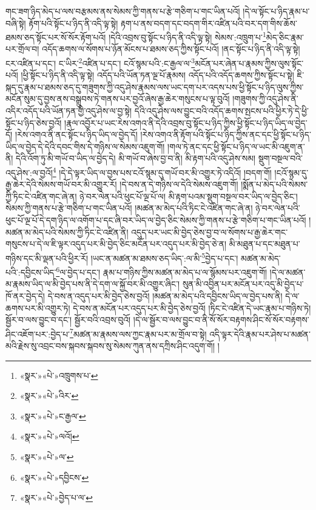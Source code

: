 གང་ཟག་ཉིད་མེད་པ་ལས་བརྩམས་ནས་སེམས་ཀྱི་གནས་པ་རྩེ་གཅིག་པ་གང་ཡིན་པའོ། །དེ་ལ་སྟོང་པ་ཉིད་རྣམ་པ་བཞི་སྟེ། རྟོག་པའི་སྟོང་པ་ཉིད་ནི་འདི་ལྟ་སྟེ། རྟག་པ་ནས་བདག་དང་བདག་གིར་འཛིན་པའི་བར་དག་གིས་ཆོས་ཐམས་ཅད་སྟོང་པར་སོ་སོར་རྟོག་པའོ། །དེའི་འབྲས་བུ་སྟོང་པ་ཉིད་ནི་འདི་ལྟ་སྟེ། སེམས་:འཁྲུག་པ་\footnote{«སྣར་»«པེ་»འཁྲུགས་པ་}མེད་ཅིང་རྣམ་པར་གྲོལ་བ། འདོད་ཆགས་ལ་སོགས་པ་ཉོན་མོངས་པ་ཐམས་ཅད་ཀྱིས་སྟོང་པའོ། །ནང་སྟོང་པ་ཉིད་ནི་འདི་ལྟ་སྟེ། ངར་འཛིན་པ་དང་། ང་ཡིར་\footnote{«སྣར་»«པེ་»འིར་}འཛིན་པ་དང་། ངའོ་སྙམ་པའི་:ང་རྒྱལ་ལ་\footnote{«སྣར་»«པེ་»ང་རྒྱལ་}མངོན་པར་ཞེན་པ་རྣམས་ཀྱིས་ལུས་སྟོང་པའོ། །ཕྱི་སྟོང་པ་ཉིད་ནི་འདི་ལྟ་སྟེ། འདོད་པའི་ཡོན་ཏན་ལྔ་པོ་རྣམས། འདོད་པའི་འདོད་ཆགས་ཀྱིས་སྟོང་པ་སྟེ། ཇི་སྐད་དུ་རྣམ་པ་ཐམས་ཅད་དུ་གཟུགས་ཀྱི་འདུ་ཤེས་རྣམས་ལས་ཡང་དག་པར་འདས་པས་ཕྱི་སྟོང་པ་ཉིད་ལུས་ཀྱིས་མངོན་སུམ་དུ་བྱས་ནས་བསྒྲུབས་ཏེ་གནས་པར་བྱའོ་ཞེས་རྒྱ་ཆེར་གསུངས་པ་ལྟ་བུའོ། །གཟུགས་ཀྱི་འདུ་ཤེས་ནི་འདིར་འདོད་པའི་ཡོན་ཏན་གྱི་འདུ་ཤེས་ལ་བྱ་སྟེ། དེའི་འདུ་ཤེས་ལས་བྱུང་བའི་འདོད་ཆགས་སྤངས་པའི་ཕྱིར་ཏེ་དེ་ཕྱི་སྟོང་པ་ཉིད་ཅེས་བྱའོ། །རྣལ་འབྱོར་པ་ཡང་རེས་འགའ་ནི་དེའི་འབྲས་བུ་སྟོང་པ་ཉིད་ཀྱིས་ཕྱི་སྟོང་པ་ཉིད་ཡིད་ལ་བྱེད་དོ། །རེས་འགའ་ནི་ནང་སྟོང་པ་ཉིད་ཡིད་ལ་བྱེད་དོ། །རེས་འགའ་ནི་རྟོག་པའི་སྟོང་པ་ཉིད་ཀྱིས་ནང་དང་ཕྱི་སྟོང་པ་ཉིད་ཡིད་ལ་བྱེད་དེ་དེའི་དབང་གིས་དེ་གཉིས་ལ་སེམས་འཇུག་གོ། །གལ་ཏེ་ནང་དང་ཕྱི་སྟོང་པ་ཉིད་ལ་ཡང་མི་འཇུག་ན་ནི། དེའི་འོག་ཏུ་མི་གཡོ་བ་ཡིད་ལ་བྱེད་དེ། མི་གཡོ་བ་ཞེས་བྱ་བ་ནི། མི་རྟག་པའི་འདུ་ཤེས་སམ། སྡུག་བསྔལ་བའི་འདུ་ཤེས་:ལ་བྱའོ།\footnote{«སྣར་»«པེ་»ལའོ།} །དེ་དེ་ལྟར་ཡིད་ལ་བྱས་པས་ངའོ་སྙམ་དུ་གཡོ་བར་མི་འགྱུར་ཏེ་འདིའོ། །བདག་གོ། །ངའོ་སྙམ་དུ་རྒྱ་ཆེར་དེའི་སེམས་གཡོ་བར་མི་འགྱུར་རོ། །དེ་བས་ན་དེ་གཉིས་ལ་དེའི་སེམས་འཇུག་གོ། །སྨོན་པ་མེད་པའི་སེམས་ཀྱི་ཏིང་ངེ་འཛིན་གང་ཞེ་ན། ཉེ་བར་ལེན་པའི་ཕུང་པོ་ལྔ་པོ་ལ། མི་རྟག་པའམ་སྡུག་བསྔལ་བར་ཡིད་ལ་བྱེད་ཅིང་། སེམས་ཀྱི་གནས་པ་རྩེ་གཅིག་པ་གང་ཡིན་པའོ། །མཚན་མ་མེད་པའི་ཏིང་ངེ་འཛིན་གང་ཞེ་ན། ཉེ་བར་ལེན་པའི་ཕུང་པོ་ལྔ་པོ་དེ་དག་ཉིད་ལ་འགོག་པ་དང་ཞི་བར་ཡིད་ལ་བྱེད་ཅིང་སེམས་ཀྱི་གནས་པ་རྩེ་གཅིག་པ་གང་ཡིན་པའོ། །མཚན་མ་མེད་པའི་སེམས་ཀྱི་ཏིང་ངེ་འཛིན་ནི། འདུད་པར་ཡང་མི་བྱེད་ཅེས་བྱ་བ་ལ་སོགས་པ་རྒྱ་ཆེར་གང་གསུངས་པ་དེ་ལ་ཇི་ལྟར་འདུད་པར་མི་བྱེད་ཅིང་མངོན་པར་འདུད་པར་མི་བྱེད་ཅེ་ན། མི་མཐུན་པ་དང་མཐུན་པ་གཉིས་དང་མི་ལྡན་པའི་ཕྱིར་རོ། །ཡང་ན་མཚན་མ་ཐམས་ཅད་ཡིད་:ལ་མི་\footnote{«སྣར་»«པེ་»ལ་}བྱེད་པ་དང་། མཚན་མ་མེད་པའི་:དབྱིངས་ཡིད་\footnote{«སྣར་»«པེ་»དབྱིངས་}ལ་བྱེད་པ་དང་། རྣམ་པ་གཉིས་ཀྱིས་མཚན་མ་མེད་པ་ལ་སྙོམས་པར་འཇུག་གོ། །དེ་ལ་མཚན་མ་རྣམས་ཡིད་ལ་མི་བྱེད་པས་ནི་དེ་དག་ལ་སྐྱོ་བར་མི་འགྱུར་ཞིང་། སུན་མི་འབྱིན་པར་མངོན་པར་འདུ་མི་བྱེད་པ་ཁོ་ནར་བྱེད་དེ། དེ་བས་ན་འདུད་པར་མི་བྱེད་ཅེས་བྱའོ། །མཚན་མ་མེད་པའི་དབྱིངས་ཡིད་ལ་བྱེད་པས་ནི། དེ་ལ་ཆགས་པར་མི་འགྱུར་ཏེ། དེ་བས་ན་མངོན་པར་འདུད་པར་མི་བྱེད་ཅེས་བྱའོ། །ཏིང་ངེ་འཛིན་དེ་ཡང་རྣམ་པ་གཉིས་ཏེ། སྦྱོར་བ་ལས་བྱུང་བ་དང་། སྦྱོར་བའི་འབྲས་བུའོ། །དེ་ལ་སྦྱོར་བ་ལས་བྱུང་བ་ནི་སོ་སོར་བརྟགས་ཤིང་སོ་སོར་བརྟགས་ཤིང་འཇོག་པར་:བྱེད་པ་\footnote{«སྣར་»«པེ་»བྱེད་པ་ལ་}མཚན་མ་རྣམས་ལས་ཀྱང་རྣམ་པར་མ་གྲོལ་བ་སྟེ། འདི་ལྟར་དེའི་རྣམ་པར་ཤེས་པ་མཚན་མའི་རྗེས་སུ་འབྲང་བས་སྐབས་སྐབས་སུ་སེམས་ཀུན་ནས་དཀྲིས་ཤིང་འདུག་གོ། །
